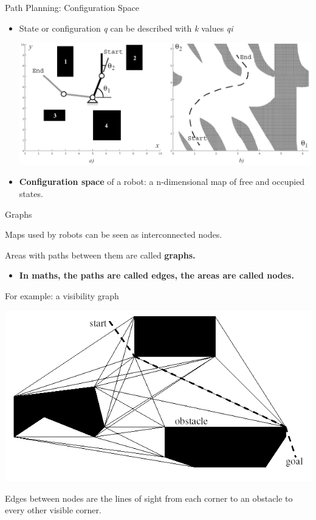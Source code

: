 \documentclass[compress]{beamer}
\begin{document}
\begin{frame}{Path Planning: Configuration Space}

\begin{itemize}
\item State or configuration \emph{q} can be described with \emph{k} values
  \emph{qi}

    \begin{center}
        \includegraphics[width=0.6\linewidth]{configurationspace}
    \end{center}

\item \textbf{Configuration space} of a robot: a n-dimensional map of free
  and occupied states.
\end{itemize}

\end{frame}

\begin{frame}{Graphs}

Maps used by robots can be seen as interconnected nodes.

Areas with paths between them are called \textbf{graphs.}

\begin{itemize}
\item \textbf{In maths, the paths are called edges, the areas are called
  nodes.}
\end{itemize}

For example: a visibility graph

    \begin{center}
        \includegraphics[width=0.6\linewidth]{visibilitygraph}
    \end{center}

Edges between nodes are the lines of sight from each corner to an
obstacle to every other visible corner.

\end{frame}
\end{document}
